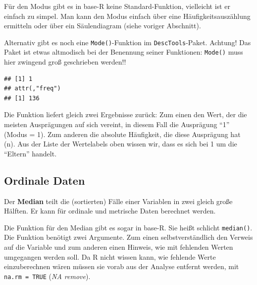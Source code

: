 \documentclass[
]{book}
\newenvironment{Shaded}{\begin{snugshade}}{\end{snugshade}}
\newcommand{\AttributeTok}[1]{\textcolor[rgb]{0.77,0.63,0.00}{#1}}
\newcommand{\ConstantTok}[1]{\textcolor[rgb]{0.00,0.00,0.00}{#1}}
\newcommand{\FunctionTok}[1]{\textcolor[rgb]{0.00,0.00,0.00}{#1}}
\newcommand{\NormalTok}[1]{#1}
\newcommand{\SpecialCharTok}[1]{\textcolor[rgb]{0.00,0.00,0.00}{#1}}
\begin{document}
Für den Modus gibt es in base-R keine Standard-Funktion, vielleicht ist er einfach zu simpel. Man kann den Modus einfach über eine Häufigkeitsauszählung ermitteln oder über ein Säulendiagram (siehe voriger Abschnitt).

Alternativ gibt es noch eine \texttt{Mode()}-Funktion im \texttt{DescTools}-Paket. Achtung! Das Paket ist etwas altmodisch bei der Benennung seiner Funktionen: \texttt{Mode()} muss hier zwingend groß geschrieben werden!!

\begin{Shaded}
\end{Shaded}

\begin{verbatim}
## [1] 1
## attr(,"freq")
## [1] 136
\end{verbatim}

Die Funktion liefert gleich zwei Ergebnisse zurück: Zum einen den Wert, der die meisten Ausprägungen auf sich vereint, in diesem Fall die Ausprägung ``1'' (Modus = 1). Zum anderen die absolute Häufigkeit, die diese Ausprägung hat (n). Aus der Liste der Wertelabels oben wissen wir, dass es sich bei 1 um die ``Eltern'' handelt.

\hypertarget{ordinale-daten}{%
\subsection{Ordinale Daten}\label{ordinale-daten}}

Der \textbf{Median} teilt die (sortierten) Fälle einer Variablen in zwei gleich große Hälften. Er kann für ordinale und metrische Daten berechnet werden.

Die Funktion für den Median gibt es sogar in base-R. Sie heißt schlicht \texttt{median()}. Die Funktion benötigt zwei Argumente. Zum einen selbstverständlich den Verweis auf die Variable und zum anderen einen Hinweis, wie mit fehlenden Werten umgegangen werden soll. Da R nicht wissen kann, wie fehlende Werte einzuberechnen wären müssen sie vorab aus der Analyse entfernt werden, mit \texttt{na.rm\ =\ TRUE} (\emph{NA remove}).

\begin{Shaded}
\end{Shaded}
\end{document}

